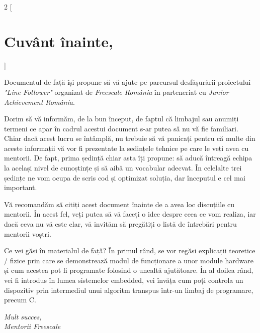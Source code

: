 \thispagestyle{empty}
\begin{multicols}{2}
[
\section*{Cuvânt înainte,}
]
\footnotesize {
Documentul de față își propune să vă ajute pe parcursul desfășurării proiectului \textit{"Line Follower"} organizat de \textit{Freescale România} în parteneriat cu \textit{Junior Achievement România}.

Dorim să vă informăm, de la bun început, de faptul că limbajul sau anumiți termeni ce apar în cadrul acestui document s-ar putea să nu vă fie familiari. Chiar dacă acest lucru se întâmplă, nu trebuie să vă panicați pentru că multe din aceste informații vă vor fi prezentate la sedințele tehnice pe care le veți avea cu mentorii. De fapt, prima ședință chiar asta îți propune: să aducă întreagă echipa la același nivel de cunoștințe și să aibă un vocabular adecvat. În celelalte trei ședințe ne vom ocupa de scris cod și optimizat soluția, dar începutul e cel mai important.

Vă recomandăm să citiți acest document înainte de a avea loc discuțiile cu mentorii. În acest fel, veți putea să vă faceți o idee despre ceea ce vom realiza, iar dacă ceva nu vă este clar, vă invităm să pregătiți o listă de întrebări pentru mentorii voștri.

Ce vei găsi în materialul de față? În primul rând, se vor regăsi explicații teoretice / fizice prin care se demonstrează modul de funcționare a unor module hardware și cum acestea pot fi programate folosind o unealtă ajutătoare. În al doilea rând, vei fi introdus în lumea sistemelor embedded, vei învăța cum poți controla un dispozitiv prin intermediul unui algoritm transpus într-un limbaj de programare, precum C.

}
\end{multicols}
\begin{flushright}\textit{Mult succes,\\Mentorii Freescale}\end{flushright}
\restoregeometry